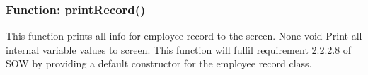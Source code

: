 \documentclass[12pt]{article}%
\newcounter{subsubsubsection}[subsubsection]
\begin{document}
\subsubsection{Function:  printRecord()}
This function prints all info for employee record to the screen.
None
void
Print all internal variable values to screen.
This function will fulfil requirement 2.2.2.8 of SOW by providing a default constructor for the
employee record class.
\end{document}
